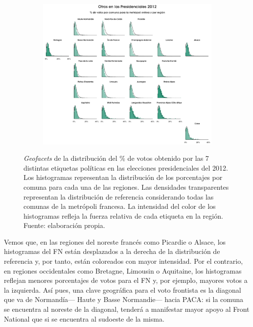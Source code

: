 \begin{figure}[h]
\begin{subfigure}{0.3\textwidth}
	\includegraphics[width = \textwidth]{Figs/AED/Geofacet_Distr_por_Reg_P12_Otros}
	\end{subfigure}
	\caption{\textit{Geofacets} de la distribución del \% de votos obtenido por las 7 distintas etiquetas políticas en las elecciones presidenciales del 2012. Los histogramas representan la distribución de los porcentajes por comuna para cada una de las regiones. Las densidades transparentes representan la distribución de referencia considerando todas las comunas de la metrópoli francesa. La intensidad del color de los histogramas refleja la fuerza relativa de cada etiqueta en la región. Fuente: elaboración propia.}
	\label{fig:Geofacet_Distr_Reg_P12}	
\end{figure}

Vemos que, en las regiones del noreste francés como Picardie o Alsace, los histogramas del FN están desplazados a la derecha de la distribución de referencia y, por tanto, están coloreados con mayor intensidad. Por el contrario, en regiones occidentales como Bretagne, Limousin o Aquitaine, los histogramas reflejan menores porcentajes de votos para el FN y, por ejemplo, mayores votos a la izquierda. Así pues, una clave geográfica para el voto frontista es la diagonal que va de Normandía--- Haute y Basse Normandie--- hacia PACA: si la comuna se encuentra al noreste de la diagonal, tenderá a manifestar mayor apoyo al Front National que si se encuentra al sudoeste de la misma.\\ 